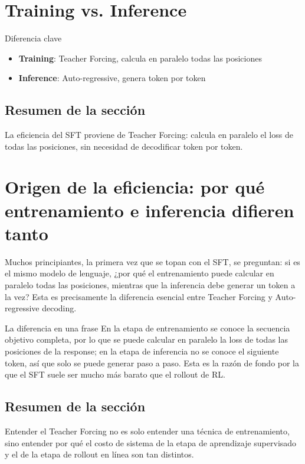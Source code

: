 \documentclass[a4paper]{article}
\begin{document}
\section{Training vs. Inference}
\begin{warningbox}{Diferencia clave}
\begin{itemize}
  \item \textbf{Training}: Teacher Forcing, calcula en paralelo todas las posiciones
  \item \textbf{Inference}: Auto-regressive, genera token por token
\end{itemize}
\end{warningbox}

\subsection{Resumen de la sección}
La eficiencia del SFT proviene de Teacher Forcing: calcula en paralelo el loss de todas las posiciones, sin necesidad de decodificar token por token.

\newpage
\section{Origen de la eficiencia: por qué entrenamiento e inferencia difieren tanto}
Muchos principiantes, la primera vez que se topan con el SFT, se preguntan: si es el mismo modelo de lenguaje, ¿por qué el entrenamiento puede calcular en paralelo todas las posiciones, mientras que la inferencia debe generar un token a la vez? Esta es precisamente la diferencia esencial entre Teacher Forcing y Auto-regressive decoding.

\begin{importantbox}{La diferencia en una frase}
En la etapa de entrenamiento se conoce la secuencia objetivo completa, por lo que se puede calcular en paralelo la loss de todas las posiciones de la response; en la etapa de inferencia no se conoce el siguiente token, así que solo se puede generar paso a paso. Esta es la razón de fondo por la que el SFT suele ser mucho más barato que el rollout de RL.
\end{importantbox}

\subsection{Resumen de la sección}
Entender el Teacher Forcing no es solo entender una técnica de entrenamiento, sino entender por qué el costo de sistema de la etapa de aprendizaje supervisado y el de la etapa de rollout en línea son tan distintos.
\end{document}
